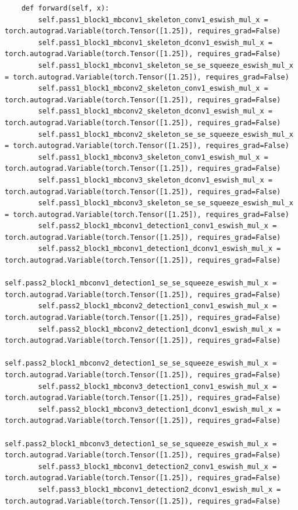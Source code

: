 \documentclass{fisatprojectfinal}
\begin{document}
\begin{appendices}
\begin{lstlisting}
    def forward(self, x):
        self.pass1_block1_mbconv1_skeleton_conv1_eswish_mul_x = torch.autograd.Variable(torch.Tensor([1.25]), requires_grad=False)
        self.pass1_block1_mbconv1_skeleton_dconv1_eswish_mul_x = torch.autograd.Variable(torch.Tensor([1.25]), requires_grad=False)
        self.pass1_block1_mbconv1_skeleton_se_se_squeeze_eswish_mul_x = torch.autograd.Variable(torch.Tensor([1.25]), requires_grad=False)
        self.pass1_block1_mbconv2_skeleton_conv1_eswish_mul_x = torch.autograd.Variable(torch.Tensor([1.25]), requires_grad=False)
        self.pass1_block1_mbconv2_skeleton_dconv1_eswish_mul_x = torch.autograd.Variable(torch.Tensor([1.25]), requires_grad=False)
        self.pass1_block1_mbconv2_skeleton_se_se_squeeze_eswish_mul_x = torch.autograd.Variable(torch.Tensor([1.25]), requires_grad=False)
        self.pass1_block1_mbconv3_skeleton_conv1_eswish_mul_x = torch.autograd.Variable(torch.Tensor([1.25]), requires_grad=False)
        self.pass1_block1_mbconv3_skeleton_dconv1_eswish_mul_x = torch.autograd.Variable(torch.Tensor([1.25]), requires_grad=False)
        self.pass1_block1_mbconv3_skeleton_se_se_squeeze_eswish_mul_x = torch.autograd.Variable(torch.Tensor([1.25]), requires_grad=False)
        self.pass2_block1_mbconv1_detection1_conv1_eswish_mul_x = torch.autograd.Variable(torch.Tensor([1.25]), requires_grad=False)
        self.pass2_block1_mbconv1_detection1_dconv1_eswish_mul_x = torch.autograd.Variable(torch.Tensor([1.25]), requires_grad=False)
        self.pass2_block1_mbconv1_detection1_se_se_squeeze_eswish_mul_x = torch.autograd.Variable(torch.Tensor([1.25]), requires_grad=False)
        self.pass2_block1_mbconv2_detection1_conv1_eswish_mul_x = torch.autograd.Variable(torch.Tensor([1.25]), requires_grad=False)
        self.pass2_block1_mbconv2_detection1_dconv1_eswish_mul_x = torch.autograd.Variable(torch.Tensor([1.25]), requires_grad=False)
        self.pass2_block1_mbconv2_detection1_se_se_squeeze_eswish_mul_x = torch.autograd.Variable(torch.Tensor([1.25]), requires_grad=False)
        self.pass2_block1_mbconv3_detection1_conv1_eswish_mul_x = torch.autograd.Variable(torch.Tensor([1.25]), requires_grad=False)
        self.pass2_block1_mbconv3_detection1_dconv1_eswish_mul_x = torch.autograd.Variable(torch.Tensor([1.25]), requires_grad=False)
        self.pass2_block1_mbconv3_detection1_se_se_squeeze_eswish_mul_x = torch.autograd.Variable(torch.Tensor([1.25]), requires_grad=False)
        self.pass3_block1_mbconv1_detection2_conv1_eswish_mul_x = torch.autograd.Variable(torch.Tensor([1.25]), requires_grad=False)
        self.pass3_block1_mbconv1_detection2_dconv1_eswish_mul_x = torch.autograd.Variable(torch.Tensor([1.25]), requires_grad=False)

\end{lstlisting}
\end{appendices}
\end{document}
